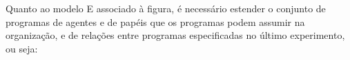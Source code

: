 \begin{figure}[h!]
    \centering
\end{figure}

Quanto ao modelo E associado à figura, é necessário estender o conjunto de programas de agentes e de papéis que os programas podem assumir na organização, e de relações entre programas especificadas no último experimento, ou seja:

